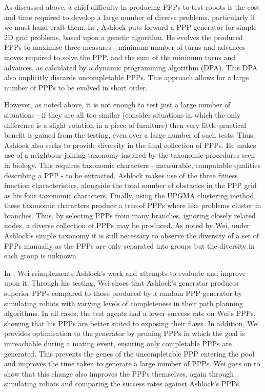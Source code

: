 \documentclass[authoryearcitations]{UoYCSproject}
\begin{document}
As discussed above, a chief difficulty in producing PPPs to test robots is the cost and time required to develop a large number of diverse problems, particularly if we must hand-craft them. In \cite{ashlock}, Ashlock puts forward a PPP generator for simple 2D grid problems, based upon a genetic algorithm. He evolves the produced PPPs to maximise three measures - minimum number of turns and advances moves required to solve the PPP, and the sum of the minimum turns and advances, as calculated by a dynamic programming algorithm (DPA). This DPA also implicitly discards uncompletable PPPs. This approach allows for a large number of PPPs to be evolved in short order.

However, as noted above, it is not enough to test just a large number of situations - if they are all too similar (consider situations in which the only difference is a slight rotation in a piece of furniture) then very little practical benefit is gained from the testing, even over a large number of such tests. Thus, Ashlock also seeks to provide diversity in the final collection of PPPs. He makes use of a neighbour joining taxonomy inspired by the taxonomic procedures seen in biology. This requires taxonomic characters - measurable, computable qualities describing a PPP - to be extracted. Ashlock makes use of the three fitness function characteristics, alongside the total number of obstacles in the PPP grid as his four taxonomic characters. Finally, using the UPGMA clustering method, these taxonomic characters produce a tree of PPPs where like problems cluster in branches. Thus, by selecting PPPs from many branches, ignoring closely related nodes, a diverse collection of PPPs may be produced. As noted by Wei, under Ashlock's simple taxonomy it is still necessary to observe the diversity of a set of PPPs manually as the PPPs are only separated into groups but the diversity in each group is unknown\cite[chapter 8, p.~66]{wei}.

In  \cite{wei}, Wei reimplements Ashlock's work and attempts to evaluate and improve upon it. Through his testing, Wei shoes that Ashlock's generator produces superior PPPs compared to those produced by a random PPP generator by simulating robots with varying levels of completeness in their path planning algorithms. In all cases, the test agents had a lower success rate on Wei's PPPs, showing that his PPPs are better suited to exposing their flaws. In addition, Wei provides optimisation to the generator by pruning PPPs in which the goal is unreachable during a mating event, ensuring only completable PPPs are generated. This prevents the genes of the uncompletable PPP entering the pool and improves the time taken to generate a large number of PPPs. Wei goes on to show that this change also improves the PPPs themselves, again through simulating robots and comparing the success rates against Ashlock's PPPs.
\end{document}
